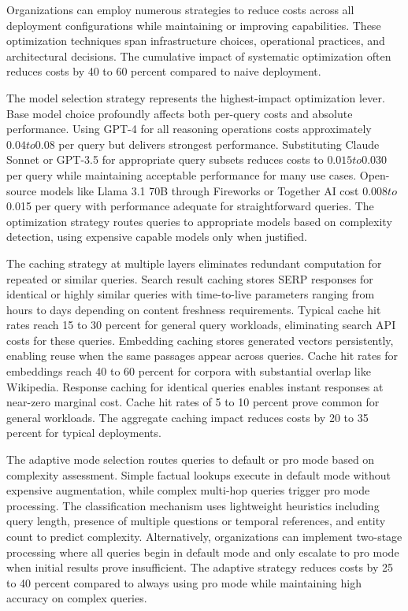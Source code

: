 Organizations can employ numerous strategies to reduce costs across all deployment configurations while maintaining or improving capabilities. These optimization techniques span infrastructure choices, operational practices, and architectural decisions. The cumulative impact of systematic optimization often reduces costs by 40 to 60 percent compared to naive deployment.

The model selection strategy represents the highest-impact optimization lever. Base model choice profoundly affects both per-query costs and absolute performance. Using GPT-4 for all reasoning operations costs approximately $0.04 to $0.08 per query but delivers strongest performance. Substituting Claude Sonnet or GPT-3.5 for appropriate query subsets reduces costs to $0.015 to $0.030 per query while maintaining acceptable performance for many use cases. Open-source models like Llama 3.1 70B through Fireworks or Together AI cost $0.008 to $0.015 per query with performance adequate for straightforward queries. The optimization strategy routes queries to appropriate models based on complexity detection, using expensive capable models only when justified.

The caching strategy at multiple layers eliminates redundant computation for repeated or similar queries. Search result caching stores SERP responses for identical or highly similar queries with time-to-live parameters ranging from hours to days depending on content freshness requirements. Typical cache hit rates reach 15 to 30 percent for general query workloads, eliminating search API costs for these queries. Embedding caching stores generated vectors persistently, enabling reuse when the same passages appear across queries. Cache hit rates for embeddings reach 40 to 60 percent for corpora with substantial overlap like Wikipedia. Response caching for identical queries enables instant responses at near-zero marginal cost. Cache hit rates of 5 to 10 percent prove common for general workloads. The aggregate caching impact reduces costs by 20 to 35 percent for typical deployments.

The adaptive mode selection routes queries to default or pro mode based on complexity assessment. Simple factual lookups execute in default mode without expensive augmentation, while complex multi-hop queries trigger pro mode processing. The classification mechanism uses lightweight heuristics including query length, presence of multiple questions or temporal references, and entity count to predict complexity. Alternatively, organizations can implement two-stage processing where all queries begin in default mode and only escalate to pro mode when initial results prove insufficient. The adaptive strategy reduces costs by 25 to 40 percent compared to always using pro mode while maintaining high accuracy on complex queries.

